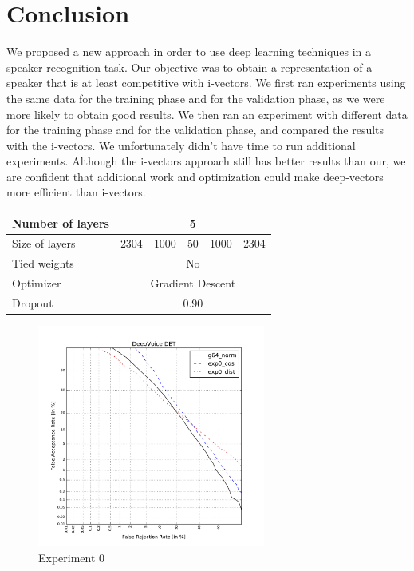\documentclass[conference]{IEEEtran}
\begin{document}
\section{Conclusion}

We proposed a new approach in order to use deep learning techniques in a speaker recognition task.
Our objective was to obtain a representation of a speaker that is at least competitive with i-vectors.
We first ran experiments using the same data for the training phase and for the validation phase, as we were more likely to obtain good results. We then ran an experiment with different data for the training phase and for the validation phase, and compared the results with the i-vectors. We unfortunately didn't have time to run additional experiments. Although the i-vectors approach still has better results than our, we are confident that additional work and optimization could make deep-vectors more efficient than i-vectors.

\newpage
\printbibliography

\newpage

\appendix

\begin{table}[!h]
\centering
\begin{tabular}{|l|c|c|c|c|c|}
\hline
Number of layers & \multicolumn{5}{c|}{5}                \\ \hline
Size of layers   & 2304   & 1000   & 50  & 1000  & 2304  \\ \hline
Tied weights     & \multicolumn{5}{c|}{No}               \\ \hline
Optimizer        & \multicolumn{5}{c|}{Gradient Descent} \\ \hline
Dropout          & \multicolumn{5}{c|}{0.90} \\ \hline
\end{tabular}
\end{table}

\begin{figure}[!h]
    \centering
    \includegraphics[width=7.5cm]{../scores/det0.pdf}
    \captionsetup{labelformat=empty}
    \caption{Experiment 0}
\end{figure}
\end{document}
